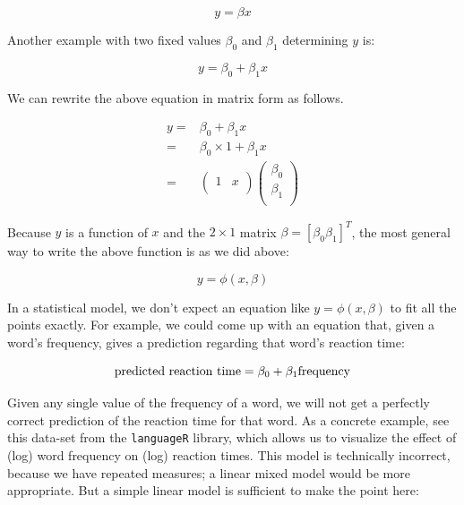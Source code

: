 \documentclass[
  12pt,
]{krantz}
\theoremstyle{definition}
\theoremstyle{definition}
\theoremstyle{definition}
\theoremstyle{definition}
\theoremstyle{remark}
\begin{document}
\begin{equation}
y = \beta x
\end{equation}

Another example with two fixed values \(\beta_0\) and \(\beta_1\) determining \(y\) is:

\begin{equation}
y = \beta_0 + \beta_1 x
\end{equation}

We can rewrite the above equation in matrix form as follows.

\begin{equation}
\begin{split}
y=& \beta_0 + \beta_1 x\\
=& \beta_0\times 1 + \beta_1 x\\
=& \begin{pmatrix}
1 & x\\
\end{pmatrix}
\begin{pmatrix}
\beta_0 \\
\beta_1 \\
\end{pmatrix}
\end{split}
\end{equation}

Because \(y\) is a function of \(x\) and the \(2\times 1\) matrix \(\beta=[\beta_0 \beta_1]^T\), the most general way to write the above function is as we did above:

\begin{equation}
y = \phi(x,\beta)
\end{equation}

In a statistical model, we don't expect an equation like \(y=\phi(x,\beta)\) to fit all the points exactly. For example, we could come up with an
equation that, given a word's frequency, gives a prediction regarding that word's reaction time:

\begin{equation}
\hbox{predicted reaction time} = \beta_0 + \beta_1 \hbox{frequency}
\end{equation}

Given any single value of the frequency of a word, we will not get a perfectly correct prediction of the reaction time for that word. As a concrete example, see this data-set from the \texttt{languageR} library, which allows us to visualize the effect of (log) word frequency on (log) reaction times. This model is technically incorrect, because we have repeated measures; a linear mixed model would be more appropriate. But a simple linear model is sufficient to make the point here:
\end{document}
